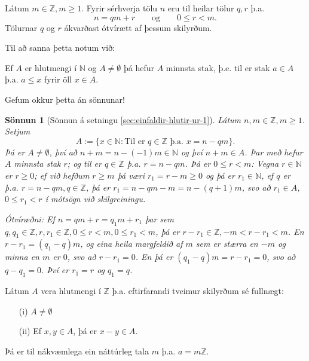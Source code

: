 \documentclass[a4paper,icelandic,11pt]{book}
\theoremstyle{plain}
\newtheorem*{sonnun}{Sönnun}
\newcommand{\N}{\mathbb{N}}
\newcommand{\Z}{\mathbb{Z}}
\begin{document}
\begin{setn}
  \label{sec:einfaldir-hlutir-ur-1}
  Látum $m\in\Z,m\ge 1$. Fyrir sérhverja tölu $n$ eru til heilar tölur $q,r$ þ.a.
  \[ n= qm + r \qquad \text{og} \qquad 0\le r < m. \]
  Tölurnar $q$ og $r$ ákvarðast ótvírætt af þessum skilyrðum.
\end{setn}
Til að sanna þetta notum við:
\begin{setn}
  Ef $A$ er hlutmengi í $\N$ og $A\neq \emptyset$ þá hefur $A$ minnsta stak,
  þ.e. til er stak $a\in A$ þ.a. $a\le x$ fyrir öll $x\in A$.
\end{setn}
Gefum okkur þetta án sönnunar!
\begin{sonnun}
  [Sönnun á setningu \ref{sec:einfaldir-hlutir-ur-1}] Látum $n,m\in\Z,m\ge
  1$. Setjum
  \[ A:= \{x\in\N: \text {Til er } q\in\Z \text{ þ.a. } x=n-qm\} .\]
  Þá er $A\neq \emptyset$, því að $n+m = n-(-1)m \in \N$ og því $n+m\in A$.
  Þar með hefur $A$ minnsta stak $r$; og til er $q\in\Z $ þ.a. $r=n-qm$. Þá er
  $0 \le r < m$: Vegna $r\in\N$ er $r\ge 0$; ef við hefðum $r\ge m$ þá væri
  $r_1 = r-m \ge 0$ og þá er $r_1 \in \N$, ef $q$ er þ.a. $ r = n-qm,q\in\Z$,
  þá er $r_1 = n-qm - m = n-(q+1)m$, svo að $r_1 \in A$, $0\le r_1 < r$ í
  mótsögn við skilgreiningu.

  \emph{Ótvíræðni:} Ef $n=qm+r = q_1 m+r_1$ þar sem $q,q_1\in\Z, r,r_1 \in\Z,
  0\le r <m, 0\le r_1 < m$, þá er $r-r_1 \in\Z, -m < r-r_1 < m$. En $r-r_1 =
  (q_1 - q)m$, og eina heila margfeldið af $m$ sem er stærra en $-m$ og minna
  en $m$ er $0$, svo að $r-r_1 = 0$. En þá er $(q_1 - q)m=r - r_1 = 0$, svo að
  $q-q_1 = 0$. Því er $r_1 = r$ og $q_1 = q$.
\end{sonnun}
\begin{setn}
  Látum $A$ vera hlutmengi í $\Z$ þ.a. eftirfarandi tveimur skilyrðum sé fullnægt:
  \begin{itemize}
  \item [(i)] $A\neq \emptyset$
  \item [(ii)] Ef $x,y\in A$, þá er $x-y\in A$.
  \end{itemize}
  Þá er til nákvæmlega ein náttúrleg tala $m$ þ.a. $a = m\Z$.
\end{setn}
\end{document}
